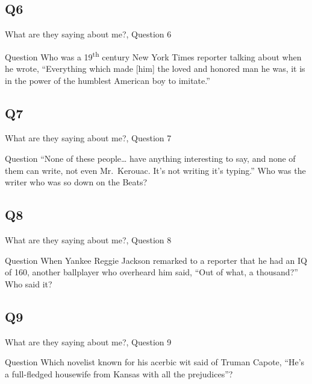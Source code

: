 \documentclass[11pt]{beamer}
\begin{document}
\subsection*{Q6}
\begin{frame}[t]{What are they saying about me?, Question 6}
\begin{block}{Question}
Who was a 19\textsuperscript{th} century New York Times reporter talking about when he wrote, ``Everything which made [him] the loved and honored man he was, it is in the power of the humblest American boy to imitate.''
\end{block}
\end{frame}
\subsection*{Q7}
\begin{frame}[t]{What are they saying about me?, Question 7}
\begin{block}{Question}
``None of these people\ldots{} have anything interesting to say, and none of them can write, not even Mr.\ Kerouac. It's not writing it's typing.'' Who was the writer who was so down on the Beats?
\end{block}
\end{frame}
\subsection*{Q8}
\begin{frame}[t]{What are they saying about me?, Question 8}
\begin{block}{Question}
When Yankee Reggie Jackson remarked to a reporter that he had an IQ of 160, another ballplayer who overheard him said, ``Out of what, a thousand?'' Who said it?
\end{block}
\end{frame}
\subsection*{Q9}
\begin{frame}[t]{What are they saying about me?, Question 9}
\begin{block}{Question}
Which novelist known for his acerbic wit said of Truman Capote, ``He's a full-fledged housewife from Kansas with all the prejudices''?
\end{block}
\end{frame}
\end{document}
